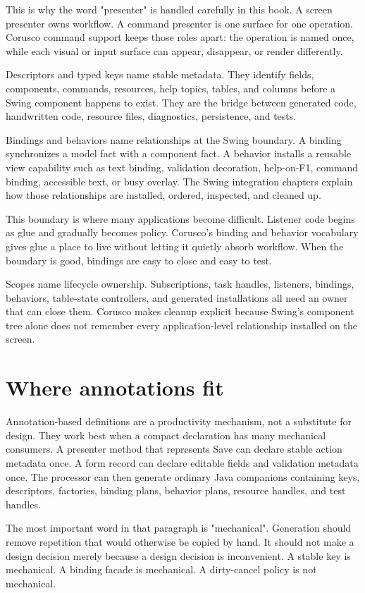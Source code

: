 This is why the word "presenter" is handled carefully in this book. A screen presenter owns workflow. A command presenter is one surface for one operation. Corusco command support keeps those roles apart: the operation is named once, while each visual or input surface can appear, disappear, or render differently.

Descriptors and typed keys name stable metadata. They identify fields, components, commands, resources, help topics, tables, and columns before a Swing component happens to exist. They are the bridge between generated code, handwritten code, resource files, diagnostics, persistence, and tests.

Bindings and behaviors name relationships at the Swing boundary. A binding synchronizes a model fact with a component fact. A behavior installs a reusable view capability such as text binding, validation decoration, help-on-F1, command binding, accessible text, or busy overlay. The Swing integration chapters explain how those relationships are installed, ordered, inspected, and cleaned up.

This boundary is where many applications become difficult. Listener code begins as glue and gradually becomes policy. Corusco's binding and behavior vocabulary gives glue a place to live without letting it quietly absorb workflow. When the boundary is good, bindings are easy to close and easy to test.

Scopes name lifecycle ownership. Subscriptions, task handles, listeners, bindings, behaviors, table-state controllers, and generated installations all need an owner that can close them. Corusco makes cleanup explicit because Swing's component tree alone does not remember every application-level relationship installed on the screen.

\section{Where annotations fit}

Annotation-based definitions are a productivity mechanism, not a substitute for design. They work best when a compact declaration has many mechanical consumers. A presenter method that represents Save can declare stable action metadata once. A form record can declare editable fields and validation metadata once. The processor can then generate ordinary Java companions containing keys, descriptors, factories, binding plans, behavior plans, resource handles, and test handles.

The most important word in that paragraph is "mechanical". Generation should remove repetition that would otherwise be copied by hand. It should not make a design decision merely because a design decision is inconvenient. A stable key is mechanical. A binding facade is mechanical. A dirty-cancel policy is not mechanical.

